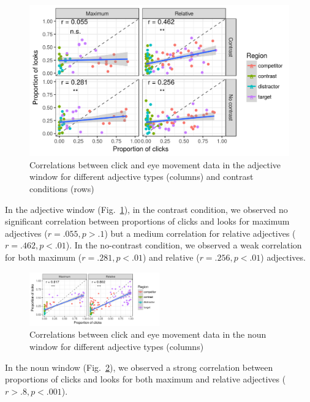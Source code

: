 \documentclass[10pt,letterpaper]{article}
\begin{document}
\begin{figure}[ht]
  \centering
 \includegraphics[width=.5\textwidth]{plots/adjBrokenDown.png}
 \caption{Correlations between click and eye movement data in the adjective window for 
   different adjective types (columns) and contrast conditions (rows)}
 \label{fig:adjcors}
\end{figure}



In the adjective window (Fig.~\ref{fig:adjcors}), in the contrast condition, 
 we observed no significant correlation between proportions of clicks and looks for maximum adjectives ($r = .055, p >.1$) but a medium correlation for relative adjectives ($r = .462, p < .01$).
In the no-contrast condition, we observed a weak correlation for both maximum ($r = .281, p < .01$) 
 and relative ($r = .256, p < .01$) adjectives. 


\begin{figure}[ht]
  \centering
  \includegraphics[width=0.5\textwidth]{plots/noun.png}
  \caption{Correlations between click and eye movement data in the noun window
    for different adjective types (columns)} 
  \vspace{-2ex}
  \label{fig:nouncors}
\end{figure}

In the noun window (Fig.~\ref{fig:nouncors}), we observed a strong correlation 
 between proportions of clicks and looks for both maximum 
 and relative adjectives ($r > .8, p < .001$). 
\end{document}
